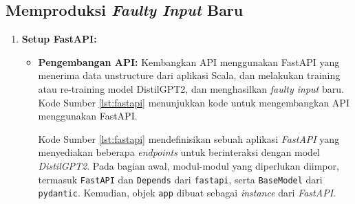\subsection{Memproduksi \emph{Faulty Input} Baru}
\label{sec:memproduksifaultyinput}
\begin{enumerate}[topsep=0pt]
  \item \textbf{Setup FastAPI:}
  \begin{itemize}
      \item \textbf{Pengembangan API:} Kembangkan API menggunakan FastAPI yang menerima data unstructure dari aplikasi Scala, dan melakukan training atau re-training model DistilGPT2, dan menghasilkan \emph{faulty input} baru.
      Kode Sumber \ref{lst:fastapi} menunjukkan kode untuk mengembangkan API menggunakan FastAPI.

      

      Kode Sumber \ref{lst:fastapi} mendefinisikan sebuah aplikasi \emph{FastAPI} yang menyediakan beberapa \emph{endpoints} untuk berinteraksi dengan model \emph{DistilGPT2}. Pada bagian awal, modul-modul yang diperlukan diimpor, termasuk \texttt{FastAPI} dan \texttt{Depends} dari \texttt{fastapi}, serta \texttt{BaseModel} dari \texttt{pydantic}. Kemudian, objek \texttt{app} dibuat sebagai \emph{instance} dari \emph{FastAPI}.


\end{itemize}
\end{enumerate}
